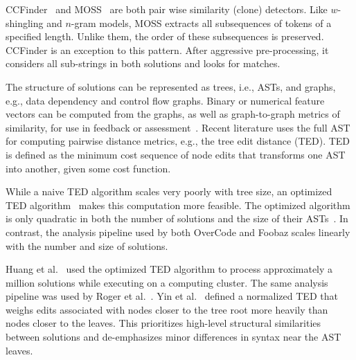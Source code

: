 CCFinder~\cite{CCFinder} and MOSS~\cite{schleimer2003winnowing} are both pair wise similarity (clone) detectors. Like $w$-shingling and $n$-gram models, MOSS extracts all subsequences of tokens of a specified length. Unlike them, the order of these subsequences is preserved. CCFinder \cite{CCFinder} is an exception to this pattern. After aggressive pre-processing, it considers all sub-strings in both solutions and looks for matches.


The structure of solutions can be represented as trees, i.e., ASTs, and graphs, e.g., data dependency and control flow graphs. Binary or numerical feature vectors can be computed from the graphs, as well as graph-to-graph metrics of similarity, for use in feedback or assessment~\cite{Robinson:1980,srikant2014system}. Recent literature uses the full AST for computing pairwise distance metrics, e.g., the tree edit distance (TED). TED is defined as the minimum cost sequence of node edits that transforms one AST into another, given some cost function.


While a naive TED algorithm scales very poorly with tree size, an optimized TED algorithm~\cite{shasha1994exact} makes this computation more feasible. The optimized algorithm is only quadratic in both the number of solutions and the size of their ASTs~\cite{MOOCshop}. In contrast, the analysis pipeline used by both OverCode and Foobaz scales linearly with the number and size of solutions. 

Huang et al.~\cite{MOOCshop} used the optimized TED algorithm to process approximately a million solutions while executing on a computing cluster. The same analysis pipeline was used by Roger et al.~\cite{ACESthesis}. Yin et al.~\cite{yin2015clustering} defined a normalized TED that weighs edits associated with nodes closer to the tree root more heavily than nodes closer to the leaves. This prioritizes high-level structural similarities between solutions and de-emphasizes minor differences in syntax near the AST leaves.


